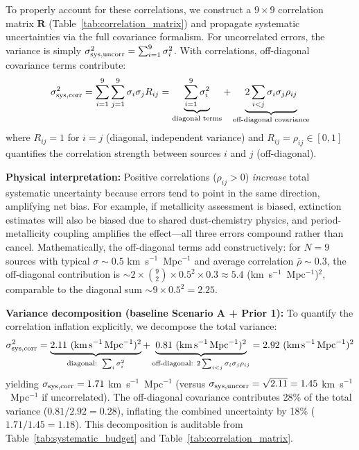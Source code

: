 \documentclass[preprint, linenumbers]{aastex701}
\begin{document}
To properly account for these correlations, we construct a $9 \times 9$ correlation matrix $\mathbf{R}$ (Table~\ref{tab:correlation_matrix}) and propagate systematic uncertainties via the full covariance formalism. For uncorrelated errors, the variance is simply $\sigma_{\rm sys,uncorr}^2 = \sum_{i=1}^{9} \sigma_i^2$. With correlations, off-diagonal covariance terms contribute:
\begin{equation}
\sigma_{\rm sys,corr}^2 = \sum_{i=1}^{9} \sum_{j=1}^{9} \sigma_i \sigma_j R_{ij} = \underbrace{\sum_{i=1}^{9} \sigma_i^2}_{\text{diagonal terms}} + \underbrace{2\sum_{i<j} \sigma_i \sigma_j \rho_{ij}}_{\text{off-diagonal covariance}}
\end{equation}
where $R_{ij} = 1$ for $i=j$ (diagonal, independent variance) and $R_{ij} = \rho_{ij} \in [0,1]$ quantifies the correlation strength between sources $i$ and $j$ (off-diagonal).

\textbf{Physical interpretation:} Positive correlations ($\rho_{ij} > 0$) \textit{increase} total systematic uncertainty because errors tend to point in the same direction, amplifying net bias. For example, if metallicity assessment is biased, extinction estimates will also be biased due to shared dust-chemistry physics, and period-metallicity coupling amplifies the effect---all three errors compound rather than cancel. Mathematically, the off-diagonal terms add constructively: for $N=9$ sources with typical $\sigma \sim 0.5$ km~s$^{-1}$~Mpc$^{-1}$ and average correlation $\bar{\rho} \sim 0.3$, the off-diagonal contribution is $\sim 2 \times \binom{9}{2} \times 0.5^2 \times 0.3 \approx 5.4$ (km~s$^{-1}$~Mpc$^{-1}$)$^2$, comparable to the diagonal sum $\sim 9 \times 0.5^2 = 2.25$.

\textbf{Variance decomposition (baseline Scenario A + Prior 1):} To quantify the correlation inflation explicitly, we decompose the total variance:
\begin{equation}
\sigma_{\rm sys,corr}^2 = \underbrace{2.11~(\mathrm{km\,s}^{-1}\,\mathrm{Mpc}^{-1})^2}_{\text{diagonal: } \sum_i \sigma_i^2} + \underbrace{0.81~(\mathrm{km\,s}^{-1}\,\mathrm{Mpc}^{-1})^2}_{\text{off-diagonal: } 2\sum_{i<j} \sigma_i \sigma_j \rho_{ij}} = 2.92~(\mathrm{km\,s}^{-1}\,\mathrm{Mpc}^{-1})^2
\end{equation}
yielding $\sigma_{\rm sys,corr} = 1.71$ km~s$^{-1}$~Mpc$^{-1}$ (versus $\sigma_{\rm sys,uncorr} = \sqrt{2.11} = 1.45$ km~s$^{-1}$~Mpc$^{-1}$ if uncorrelated). The off-diagonal covariance contributes 28\% of the total variance ($0.81/2.92 = 0.28$), inflating the combined uncertainty by 18\% ($1.71/1.45 = 1.18$). This decomposition is auditable from Table~\ref{tab:systematic_budget} and Table~\ref{tab:correlation_matrix}.
\end{document}
